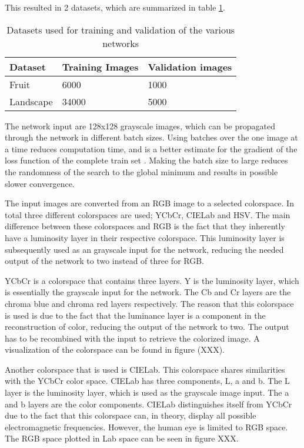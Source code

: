 This resulted in 2 datasets, which are summarized in table \ref{tab:dataset}.

\begin{table}[h!]
	\centering
	\caption{Datasets used for training and validation of the various networks}
	\label{tab:dataset}
	\begin{tabular}{|l|l|l|}
		\hline
		Dataset   & Training Images & Validation images \\ \hline
		Fruit     & 6000            & 1000              \\ \hline
		Landscape & 34000           & 5000              \\ \hline
	\end{tabular}
\end{table}

The network input are 128x128 grayscale images, which can be propagated through the network in different batch sizes. Using batches over the one image at a time reduces computation time, and is a better estimate for the gradient of the loss function of the complete train set \cite{ioffe2015batch}. Making the batch size to large reduces the randomness of the search to the global minimum and results in possible slower convergence.


The input images are converted from an RGB image to a selected colorspace. 
In total three different colorspaces are used; YCbCr, CIELab and HSV. 
The main difference between these colorspaces and RGB is the fact that they inherently have a luminosity layer in their respective colorspace. This luminosity layer is subsequently used as an grayscale input for the network, reducing the needed output of the network to two instead of three for RGB. 
 

YCbCr is a colorspace that contains three layers. Y is the luminosity layer, which is essentially the grayscale input for the network.
The Cb and Cr layers are the chroma blue and chroma red layers respectively.
The reason that this colorspace is used is due to the fact that the luminance layer is a component in the reconstruction of color, reducing the output of the network to two.
The output has to be recombined with the input to retrieve the colorized image.
A visualization of the colorspace can be found in figure (XXX).


Another colorspace that is used is CIELab.
This colorspace shares similarities with the YCbCr color space.
CIELab has three components, L, a and b. The L layer is the luminosity layer, which is used as the grayscale image input.
The a and b layers are the color components. CIELab distinguishes itself from YCbCr due to the fact that this colorspace can, in theory, display all possible electromagnetic frequencies. 
However, the human eye is limited to RGB space. The RGB space plotted in Lab space can be seen in {\color{red} figure XXX}. 


